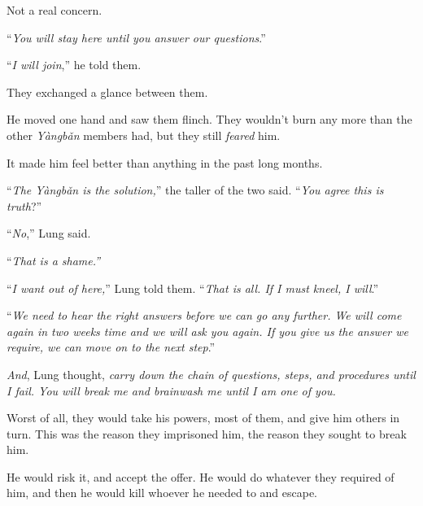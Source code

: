 Not a real concern.



``\emph{You will stay here until you answer our questions}.''



``\emph{I will join},'' he told them.



They exchanged a glance between them.



He moved one hand and saw them flinch.  They wouldn't burn any more than the other \emph{Y\`{a}ngb\v{a}n} members had, but they still \emph{feared }him.



It made him feel better than anything in the past long months.



``\emph{The Y\`{a}ngb\v{a}n is the solution,}'' the taller of the two said.  ``\emph{You agree this is truth}?''



``\emph{No},'' Lung said.



``\emph{That is a shame.''}



``\emph{I want out of here,}'' Lung told them.  ``\emph{That is all.  If I must kneel, I will}.''



``\emph{We need to hear the right answers before we can go any further.  We will come again in two weeks time and we will ask you again.  If you give us the answer we require, we can move on to the next step}.''



\emph{And}, Lung thought, \emph{carry down the chain of questions, steps, and procedures until I fail.  You will break me and brainwash me until I am one of you.}



Worst of all, they would take his powers, most of them, and give him others in turn.  This was the reason they imprisoned him, the reason they sought to break him.



He would risk it, and accept the offer.  He would do whatever they required of him, and then he would kill whoever he needed to and escape.



\blacksquare






